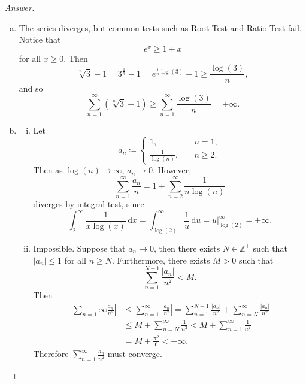 \documentclass[12pt]{article}
\newcommand{\z}{\mathbb{Z}}
\newcommand\paren[1]{\left( #1 \right)}
\newcommand{\abs}[1]{\left | #1 \right |}
\renewcommand{\i}[4]{\int_{#1}^{#2} {#3} \, \mathrm{d} {#4} }
\theoremstyle{definition}
\begin{document}
\begin{proof}[Answer]
    \noindent 
    \begin{enumerate}[(a)]
        \item The series diverges, but common tests such as Root Test and Ratio Test fail. Notice that 
        \[
            e^x \geq 1 + x
        \]
        for all $x \geq 0$. Then 
        \[
            \sqrt[n]{3} - 1 = 3^{\frac{1}{n}} - 1 = e^{\frac{1}{n}\log(3)} - 1 \geq \frac{\log(3)}{n} , 
        \]
        and so 
        \[
            \sum\limits_{n = 1}^{\infty} \paren{ \sqrt[n]{3} - 1 } \geq \sum\limits_{n = 1}^{\infty} \frac{\log(3)}{n} = +\infty. 
        \]
        \item 
        \begin{enumerate}[i.]
            \item Let 
            \[
                a_n \coloneqq 
                \begin{cases}
                    1 , & \quad n = 1 , \\ 
                    \frac{1}{\log(n)} , & \quad n \geq 2 .
                \end{cases}
            \]
            Then as $\log(n) \to \infty$, $a_n \to 0$. However, 
            \[
                \sum\limits_{n = 1}^{\infty} \frac{a_n}{n} = 1 + \sum\limits_{n = 2}^{\infty} \frac{1}{n \log(n)}
            \]
            diverges by integral test, since
            \[
                \i{2}{\infty}{\frac{1}{x \log(x)}}{x} = \i{\log(2)}{\infty}{\frac{1}{u}}{u} = \left. u \right|_{\log(2)}^{\infty} = +\infty . 
            \]
            \item Impossible. Suppose that $a_n \to 0$, then there exists $N \in \z^+$ such that $\abs{ a_n } \leq 1$ for all $n \geq N$. Furthermore, there exists $M > 0$ such that
            \[
                \sum\limits_{n = 1}^{N-1} \frac{\abs{ a_n }}{n^2} < M .
            \]
            Then 
            \begin{align*}
                \abs{ \sum\limits_{n = 1}{\infty} \frac{a_n}{n^2} } & \leq \sum\limits_{n = 1}^{\infty} \abs{ \frac{a_n}{n^2} } = \sum\limits_{n = 1}^{N-1} \frac{ \abs{ a_n } }{n^2} + \sum\limits_{n = N}^{\infty} \frac{ \abs{ a_n } }{n^2} \\ 
                & \leq M + \sum\limits_{n = N}^{\infty} \frac{1}{n^2} < M + \sum\limits_{n = 1}^{\infty} \frac{1}{n^2} \\ 
                & = M + \frac{\pi^2}{6} < +\infty . 
            \end{align*}
            Therefore $\sum\limits_{n = 1}^{\infty} \frac{a_n}{n^2}$ must converge. 

\end{enumerate}
\end{enumerate}
\end{proof}
\end{document}
